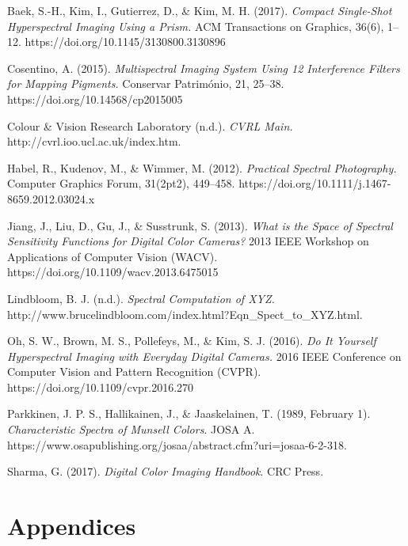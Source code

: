 \documentclass[twocolumn,10pt]{asme2ej}
\begin{document}
 \begin{thebibliography}{12}

{Baek, S.-H., Kim, I., Gutierrez, D., \& Kim, M. H. (2017). \emph{Compact Single-Shot Hyperspectral Imaging Using a Prism.} ACM Transactions on Graphics, 36(6), 1–12. https://doi.org/10.1145/3130800.3130896}

{Cosentino, A. (2015). \emph{Multispectral Imaging System Using 12 Interference Filters for Mapping Pigments.} Conservar Património, 21, 25–38. https://doi.org/10.14568/cp2015005}

{Colour \& Vision Research Laboratory (n.d.). \emph{CVRL Main.} http://cvrl.ioo.ucl.ac.uk/index.htm.}

{Habel, R., Kudenov, M., \& Wimmer, M. (2012). \emph{Practical Spectral Photography.} Computer Graphics Forum, 31(2pt2), 449–458. https://doi.org/10.1111/j.1467-8659.2012.03024.x}

{Jiang, J., Liu, D., Gu, J., \& Susstrunk, S. (2013). \emph{What is the Space of Spectral Sensitivity Functions for Digital Color Cameras?} 2013 IEEE Workshop on Applications of Computer Vision (WACV). https://doi.org/10.1109/wacv.2013.6475015}

{Lindbloom, B. J. (n.d.). \emph{Spectral Computation of XYZ.} http://www.brucelindbloom.com/index.html?Eqn\_Spect\_to\_XYZ.html.}

{Oh, S. W., Brown, M. S., Pollefeys, M., \& Kim, S. J. (2016). \emph{Do It Yourself Hyperspectral Imaging with Everyday Digital Cameras.} 2016 IEEE Conference on Computer Vision and Pattern Recognition (CVPR). https://doi.org/10.1109/cvpr.2016.270}

 {Parkkinen, J. P. S., Hallikainen, J., \& Jaaskelainen, T. (1989, February 1). \emph{Characteristic Spectra of Munsell Colors}. JOSA A. https://www.osapublishing.org/josaa/abstract.cfm?uri=josaa-6-2-318.}

{Sharma, G. (2017). \emph{Digital Color Imaging Handbook}. CRC Press.}

\end{thebibliography}
 
 

\clearpage 
\onecolumn
\section{Appendices}
\end{document}
